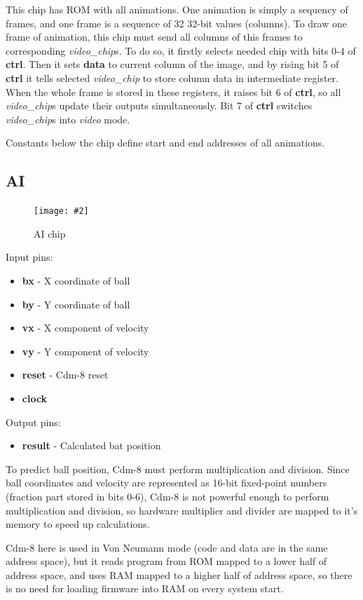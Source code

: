 \documentclass[12pt,a4paper]{article}
\newcommand{\dofigure}[3][H]{
    \begin{figure}[#1]
        \centering
        \texttt{[image: \#2]}
        \caption{#3}
    \end{figure}
}
\newcommand{\chip}[1]{{\itshape#1}}
\newcommand{\pin}[1]{\textbf{#1}}
\newenvironment{pins}{
    
    \let\oldpin\pin
    \renewcommand{\pin}[1]{\item\oldpin{##1}}
    \newcommand{\inputs}[1]{
        
    Input pins:\begin{itemize}##1\end{itemize}}
    \newcommand{\outputs}[1]{
        
    Output pins:\begin{itemize}##1\end{itemize}}
}{}
\begin{document}
    This chip has ROM with all animations. One animation is simply a sequency of frames, and one frame is a sequence of 32 32-bit values (columns). To draw one frame of animation, this chip must send all columns of this frames to corresponding \chip{video\_chip}s. To do so, it firstly selects needed chip with bits 0-4 of \pin{ctrl}. Then it sets \pin{data} to current column of the image, and by rising bit 5 of \pin{ctrl} it tells selected \chip{video\_chip} to store column data in intermediate register. When the whole frame is stored in these registers, it raises bit 6 of \pin{ctrl}, so all \chip{video\_chip}s update their outputs simultaneously. Bit 7 of \pin{ctrl} switches \chip{video\_chip}s into {\itshape{video}} mode.

    Constants below the chip define start and end addresses of all animations.


    \subsection{AI}
    \dofigure{ai}{AI chip}
    \begin{pins}
        \inputs{
            \pin{bx} - X coordinate of ball
            \pin{by} - Y coordinate of ball
            \pin{vx} - X component of velocity
            \pin{vy} - Y component of velocity
            \pin{reset} - Cdm-8 reset
            \pin{clock}
        }
        \outputs{
            \pin{result} - Calculated bat position
        }
    \end{pins}

    To predict ball position, Cdm-8 must perform multiplication and division.
    Since ball coordinates and velocity are represented as 16-bit fixed-point numbers (fraction part stored in bits 0-6), Cdm-8 is not powerful enough to perform multiplication and division, so hardware multiplier and divider are mapped to it's memory to speed up calculations.

    Cdm-8 here is used in Von Neumann mode (code and data are in the same address space), but it reads program from ROM mapped to a lower half of address space, and uses RAM mapped to a higher half of address space, so there is no need for loading firmware into RAM on every system start.

    
\end{document}
